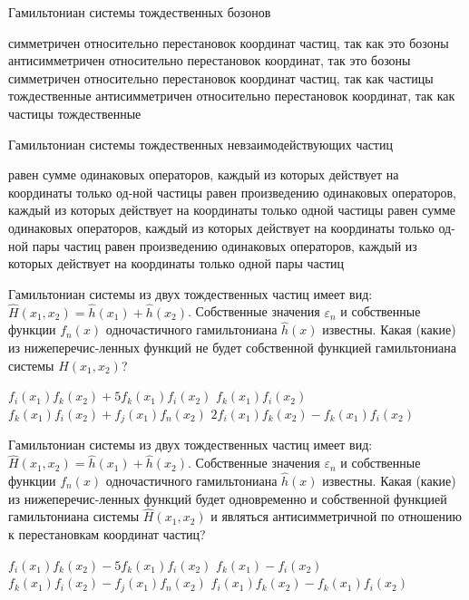 \documentclass[11pt,a4paper]{exam}
\begin{document}
\begin{questions}
\question Гамильтониан системы тождественных бозонов
\begin{choices}
\choice симметричен относительно перестановок координат частиц, так как это бозоны
\choice антисимметричен относительно перестановок координат, так это бозоны
\choice симметричен относительно перестановок координат частиц, так как частицы тождественные
\choice антисимметричен относительно перестановок координат, так как частицы тождественные
\end{choices}

\question Гамильтониан системы тождественных невзаимодействующих частиц
\begin{choices}
\choice равен сумме одинаковых операторов, каждый из которых действует на координаты только од-ной частицы
\choice равен произведению одинаковых операторов, каждый из которых действует на координаты только одной частицы
\choice равен сумме одинаковых операторов, каждый из которых действует на координаты только од-ной пары частиц
\choice равен произведению одинаковых операторов, каждый из которых действует на координаты только одной пары частиц
\end{choices}

\question Гамильтониан системы из двух тождественных частиц имеет вид: $\hat H({x_1},{x_2}) = \hat h({x_1}) + \hat h({x_2})$. Собственные значения ${\varepsilon _n}$ и собственные функции ${f_n}(x)$ одночастичного гамильтониана $\hat h(x)$ известны. Какая (какие) из нижеперечис-ленных функций не будет собственной функцией гамильтониана системы $\hat H({x_1},{x_2})$?
\begin{choices}
\choice ${f_i}({x_1}){f_k}({x_2}) + 5{f_k}({x_1}){f_i}({x_2})$      
\choice ${f_k}({x_1}){f_i}({x_2})$
\choice ${f_k}({x_1}){f_i}({x_2}) + {f_j}({x_1}){f_n}({x_2})$    
\choice $2{f_i}({x_1}){f_k}({x_2}) - {f_k}({x_1}){f_i}({x_2})$
\end{choices}

\question Гамильтониан системы из двух тождественных частиц имеет вид: $\hat H({x_1},{x_2}) = \hat h({x_1}) + \hat h({x_2})$. Собственные значения ${\varepsilon _n}$ и собственные функции ${f_n}(x)$ одночастичного гамильтониана $\hat h(x)$ известны. Какая (какие) из нижеперечис-ленных функций будет одновременно и собственной функцией гамильтониана системы $\hat H({x_1},{x_2})$ и являться антисимметричной по отношению к перестановкам координат частиц?
\begin{choices}
\choice ${f_i}({x_1}){f_k}({x_2}) - 5{f_k}({x_1}){f_i}({x_2})$      
\choice ${f_k}({x_1}) - {f_i}({x_2})$
\choice ${f_k}({x_1}){f_i}({x_2}) - {f_j}({x_1}){f_n}({x_2})$    
\choice ${f_i}({x_1}){f_k}({x_2}) - {f_k}({x_1}){f_i}({x_2})$
\end{choices}


\end{questions}
\end{document}
